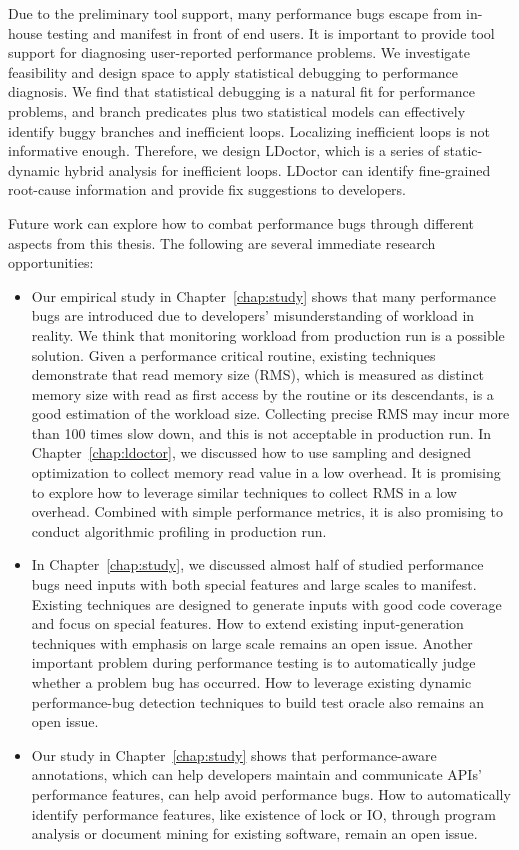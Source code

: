 Due to the preliminary tool support, 
many performance bugs escape from in-house testing and manifest in front of end users. 
It is important to provide tool support for diagnosing user-reported performance problems. 
We investigate feasibility and design space to apply statistical debugging to performance diagnosis. 
We find that statistical debugging is a natural fit for performance problems, 
and branch predicates plus two statistical models can effectively identify buggy branches and inefficient loops. 
Localizing inefficient loops is not informative enough. Therefore, we design LDoctor, 
which is a series of static-dynamic hybrid analysis for inefficient loops. 
LDoctor can identify fine-grained root-cause information and provide fix suggestions to developers.

Future work can explore how to combat performance bugs through different aspects from this thesis. 
The following are several immediate research opportunities:

\begin{itemize}

\item
Our empirical study in Chapter~\ref{chap:study} 
shows that many performance bugs are introduced due to developers' misunderstanding of workload in reality. 
We think that monitoring workload from production run is a possible solution.
Given a performance critical routine, existing techniques demonstrate that read memory size (RMS), 
which is measured as distinct memory size with read as first access by the routine or its descendants, is a good estimation of the workload size. 
Collecting precise RMS may incur more than 100 times slow down, and this is not acceptable in production run.  
In Chapter~\ref{chap:ldoctor}, we discussed how to use sampling and designed optimization to collect memory read value in a low overhead. 
It is promising to explore how to leverage similar techniques to collect RMS in a low overhead. 
Combined with simple performance metrics, it is also promising to conduct algorithmic profiling in production run. 

\item
In Chapter~\ref{chap:study}, 
we discussed almost half of studied performance bugs need inputs with both special features and large scales to manifest. 
Existing techniques are designed to generate inputs with good code coverage and focus on special features.
How to extend existing input-generation techniques with emphasis on large scale remains an open issue. 
Another important problem during performance testing is to automatically judge whether a problem bug has occurred. 
How to leverage existing dynamic performance-bug detection techniques to build test oracle also remains an open issue. 


\item
Our study in Chapter~\ref{chap:study} shows that performance-aware annotations, 
which can help developers maintain and communicate APIs' performance features, 
can help avoid performance bugs. 
How to automatically identify performance features, 
like existence of lock or IO, 
through program analysis or document mining for existing software, remain an open issue. 

\end{itemize} 
